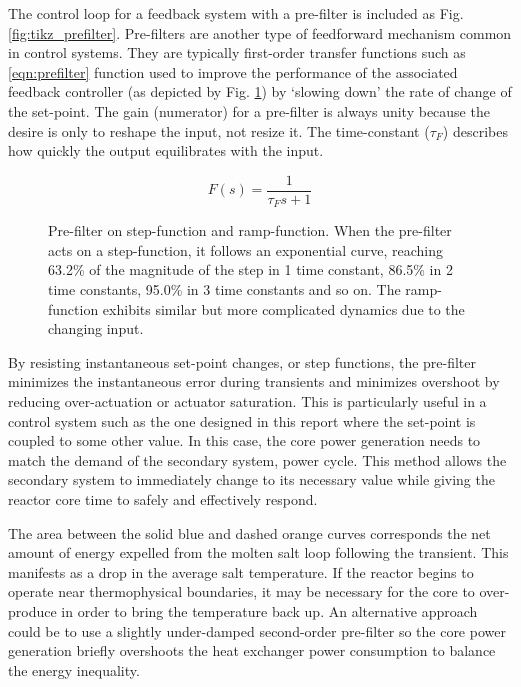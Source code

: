 The control loop for a feedback system with a pre-filter is included as Fig. \ref{fig:tikz_prefilter}. Pre-filters are another type of feedforward mechanism common in control systems. They are typically first-order transfer functions such as \ref{eqn:prefilter} function used to improve the performance of the associated feedback controller (as depicted by Fig. \ref{fig:pgf_prefilter}) by `slowing down' the rate of change of the set-point. The gain (numerator) for a pre-filter is always unity because the desire is only to reshape the input, not resize it. The time-constant ($\tau_F$) describes how quickly the output equilibrates with the input. 

\begin{equation}\label{eqn:prefilter}
    F(s)=\frac{1}{\tau_F s+1}    
\end{equation}

\begin{figure}[!ht]
    \centering
    \qquad
    \caption[Pre-filter on (a) step-function and (b) ramp-function]{Pre-filter on step-function and ramp-function. When the pre-filter acts on a step-function, it follows an exponential curve, reaching 63.2\% of the magnitude of the step in 1 time constant, 86.5\% in 2 time constants, 95.0\% in 3 time constants and so on. The ramp-function exhibits similar but more complicated dynamics due to the changing input.}
    \label{fig:pgf_prefilter}
\end{figure}

By resisting instantaneous set-point changes, or step functions, the pre-filter minimizes the instantaneous error during transients and minimizes overshoot by reducing over-actuation or actuator saturation.  This is particularly useful in a control system such as the one designed in this report where the set-point is coupled to some other value. In this case, the core power generation needs to match the demand of the secondary system, \eg power cycle. This method allows the secondary system to immediately change to its necessary value while giving the reactor core time to safely and effectively respond. 

The area between the solid blue and dashed orange curves corresponds the net amount of energy expelled from the molten salt loop following the transient. This manifests as a drop in the average salt temperature. If the reactor begins to operate near thermophysical boundaries, it may be necessary for the core to over-produce in order to bring the temperature back up. An alternative approach could be to use a slightly under-damped second-order pre-filter so the core power generation briefly overshoots the heat exchanger power consumption to balance the energy inequality.

